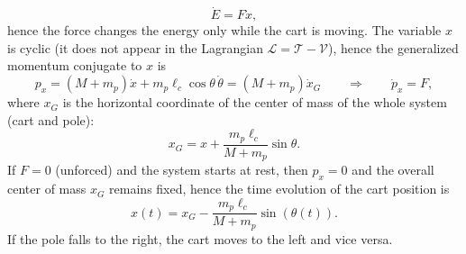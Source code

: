 \documentclass[10pt, a4paper]{report}
\begin{document}
\begin{equation}
    \dot E = F\dot x,
\end{equation}
hence the force changes the energy only while the cart is moving. The variable $x$ is cyclic (it does not appear in the Lagrangian $\mathcal L=\mathcal T-\mathcal V$), hence the generalized momentum conjugate to $x$ is
\begin{equation}
    p_x=(M+m_p)\dot x+m_p\ell_c\cos\theta\,\dot\theta=(M+m_p)\dot x_G\qquad\Longrightarrow\qquad\dot p_x=F,
\end{equation}
where $x_G$ is the horizontal coordinate of the center of mass of the whole system (cart and pole):
\begin{equation}
    x_G=x+\frac{m_p\ell_c}{M+m_p}\sin\theta.
\end{equation}
If $F=0$ (unforced) and the system starts at rest, then $p_x=0$ and the overall center of mass $x_G$ remains fixed, hence the time evolution of the cart position is
\begin{equation}
    x(t)=x_G-\frac{m_p\ell_c}{M+m_p}\sin\left(\theta(t)\right).
\end{equation}
If the pole falls to the right, the cart moves to the left and vice versa.
\end{document}
